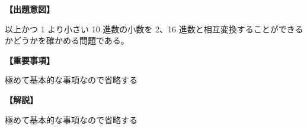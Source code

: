 \noindent \textbf{【出題意図】}

 以上かつ 1 より小さい 10 進数の小数を 2、16 進数と相互変換することができるかどうかを確かめる問題である。

\vspace{1em}
\noindent \textbf{【重要事項】}

\noindent 極めて基本的な事項なので省略する

\vspace{1em}
\noindent \textbf{【解説】}

\noindent 極めて基本的な事項なので省略する
